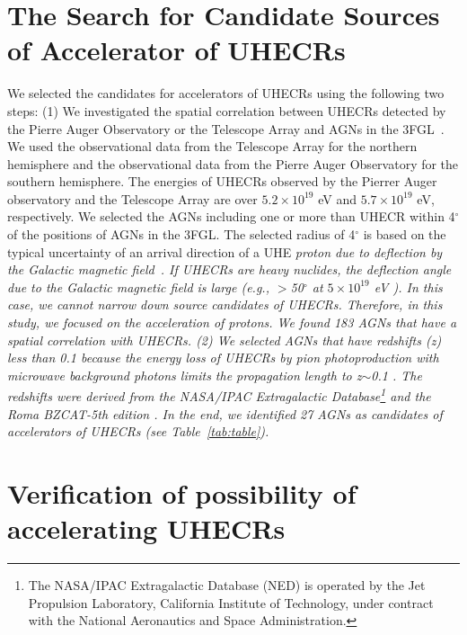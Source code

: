 \documentclass{aastex6}
\begin{document}
\section{The Search for Candidate Sources of Accelerator of UHECRs}
\label{sec:selection}

We selected the candidates for accelerators of UHECRs using the following two steps: (1) We investigated the spatial correlation between UHECRs detected by the Pierre Auger Observatory \citep{Augerdata} or the Telescope Array \citep{TAdata} and AGNs in the 3FGL~\citep{Fermi}.
We used the observational data from the Telescope Array for the northern hemisphere and the observational data from the Pierre Auger Observatory for the southern hemisphere.
The energies of UHECRs observed by the Pierrer Auger observatory and the Telescope Array are over $5.2\times10^{19}$ eV and $5.7\times10^{19}$ eV, respectively.
We selected the AGNs including one or more than UHECR within 4$^{\circ}$ of the positions of AGNs in the 3FGL.
The selected radius of 4$^{\circ}$ is based on the typical uncertainty of an arrival direction of a UHE \it{proton}\rm{} due to deflection by the Galactic magnetic field~\citep{Propagation}.
If UHECRs are heavy nuclides, the deflection angle due to the Galactic magnetic field is large (e.g., $>$50$^{\circ}$ at $5\times10^{19}$ eV \cite{iron}).
In this case, we cannot narrow down source candidates of UHECRs.
Therefore, in this study, we focused on the acceleration of protons.
We found 183 AGNs that have a spatial correlation with UHECRs.
(2) We selected AGNs that have redshifts (z) less than 0.1 because the energy loss of UHECRs by pion photoproduction with microwave background photons limits the propagation length to z$\sim$0.1 \citep[e.g.,][]{GZK1,GZK2}.
The redshifts were derived  from the NASA/IPAC Extragalactic Database\footnote{The NASA/IPAC Extragalactic Database (NED) is operated by the Jet Propulsion Laboratory, California Institute of Technology, under contract with the National Aeronautics and Space Administration.} and the Roma BZCAT-5th edition \citep{BZCAT}.
In the end, we identified 27 AGNs as candidates of accelerators of UHECRs (see Table~\ref{tab:table}).

\section{Verification of possibility of accelerating UHECRs}
\label{sec:result}
\end{document}
